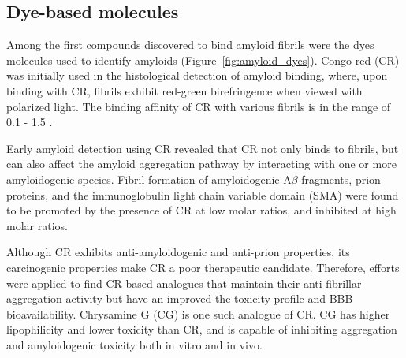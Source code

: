 
\subsection{Dye-based molecules}

Among the first compounds discovered to bind amyloid fibrils were the dyes molecules used to identify amyloids (Figure~\ref{fig:amyloid_dyes}). Congo red (CR) was initially used in the histological detection of amyloid binding, where, upon binding with CR, fibrils exhibit red-green birefringence when viewed with polarized light.\cite{Frid:2007bo} The binding affinity of CR with various fibrils is in the range of 0.1 - 1.5 \micromolar.\cite{Lendel:2009cg,Benditt:1970va,Klunk:1989vc}

Early amyloid detection using CR revealed that CR not only binds to fibrils, but can also affect the amyloid aggregation pathway by interacting with one or more amyloidogenic species.\cite{Caspi:1998vt}
Fibril formation of amyloidogenic A$\beta$ fragments,\cite{Esler:1997bq} prion proteins,\cite{Rudyk:2000ta} and the immunoglobulin light chain variable domain (SMA)\cite{Kim:2003hv} were found to be promoted by the presence of CR at low molar ratios, and inhibited at high molar ratios. 

Although CR exhibits anti-amyloidogenic and anti-prion properties, its carcinogenic properties make CR a poor therapeutic candidate.\cite{Hawkes:2009gu} Therefore, efforts were applied to find CR-based analogues that maintain their anti-fibrillar aggregation activity but have an improved the toxicity profile and BBB bioavailability. Chrysamine G (CG) is one such analogue of CR. CG has higher lipophilicity and lower toxicity than CR, and is capable of inhibiting aggregation and amyloidogenic toxicity both in vitro and in vivo.\cite{Klunk:1994um,Klunk:1998vm,Reinke:2007p155,Ishii:2002uf}

